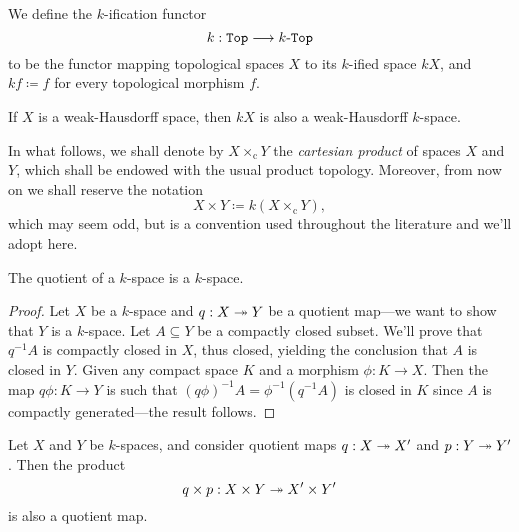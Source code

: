\begin{definition}
    \label{def:k-ification-functor}
    We define the \(k\)-ification functor
    \[
        k: {\texttt{Top}} \longrightarrow {k\text{-}\texttt{Top}}
    \]
    to be the functor mapping topological spaces \(X\) to its \(k\)-ified space
    \(k X\), and \(k f \coloneq f\) for every topological morphism \(f\).
\end{definition}

\begin{lemma}
    \label{lem:weak-hausdorff-into-compactly-generated-space}
    If \(X\) is a weak-Hausdorff space, then \(kX\) is also a weak-Hausdorff
    \(k\)-space.
\end{lemma}

\begin{notation}[Products]
    \label{not:cartesian-and-k-products}
    In what follows, we shall denote by \(X \times_{\text{c}} Y\) the
    \emph{cartesian product} of spaces \(X\) and \(Y\), which shall be endowed with
    the usual product topology. Moreover, from now on we shall reserve the notation
    \[
        X \times Y \coloneq k(X \times_{\text{c}} Y),
    \]
    which may seem odd, but is a convention used throughout the literature and we'll
    adopt here.
\end{notation}

\begin{proposition}[Quotients]
    \label{prop:quotient-k-space-is-k-space}
    The quotient of a \(k\)-space is a \(k\)-space.
\end{proposition}

\begin{proof}
    Let \(X\) be a \(k\)-space and \(q: X \twoheadrightarrow Y\) be a quotient map---we want to
    show that \(Y\) is a \(k\)-space. Let \(A \subseteq Y\) be a compactly closed
    subset. We'll prove that \(q^{-1} A\) is compactly closed in \(X\), thus closed,
    yielding the conclusion that \(A\) is closed in \(Y\). Given any compact space
    \(K\) and a morphism \(\phi: K \to X\). Then the map \(q \phi: K \to Y\) is such
    that \((q \phi)^{-1} A = \phi^{-1}(q^{-1} A)\) is closed in \(K\) since \(A\) is
    compactly generated---the result follows.
\end{proof}

\begin{proposition}
    \label{prop:k-space-product-of-quotient-maps-is-quotient-map}
    Let \(X\) and \(Y\) be \(k\)-spaces, and consider quotient maps \(q: X \twoheadrightarrow X'\)
    and \(p: Y \twoheadrightarrow Y'\). Then the product
    \[
        q \times p: X \times Y \twoheadrightarrow X' \times Y'
    \]
    is also a quotient map.
\end{proposition}

